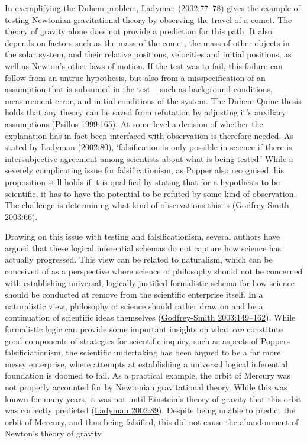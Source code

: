 \documentclass[
  a4paper,
  oneside]{uiophdthesis}
\begin{document}
In exemplifying the Duhem problem, Ladyman (\protect\hyperlink{ref-ladyman2002}{2002:77--78}) gives the example of testing Newtonian gravitational theory by observing the travel of a comet. The theory of gravity alone does not provide a prediction for this path. It also depends on factors such as the mass of the comet, the mass of other objects in the solar system, and their relative positions, velocities and initial positions, as well as Newton's other laws of motion. If the test was to fail, this failure can follow from an untrue hypothesis, but also from a misspecification of an assumption that is subsumed in the test -- such as background conditions, measurement error, and initial conditions of the system. The Duhem-Quine thesis holds that any theory can be saved from refutation by adjusting it's auxiliary assumptions (\protect\hyperlink{ref-psillos1999}{Psillos 1999:165}). At some level a decision of whether the explanation has in fact been interfaced with observation is therefore needed. As stated by Ladyman (\protect\hyperlink{ref-ladyman2002}{2002:80}), `falsification is only possible in science if there is intersubjective agreement among scientists about what is being tested.' While a severely complicating issue for falsificationism, as Popper also recognised, his proposition still holds if it is qualified by stating that for a hypothesis to be scientific, it has to have the potential to be refuted by some kind of observation. The challenge is determining what kind of observations this is (\protect\hyperlink{ref-godfrey-smith2003}{Godfrey-Smith 2003:66}).

Drawing on this issue with testing and falsificationism, several authors have argued that these logical inferential schemas do not capture how science has actually progressed. This view can be related to naturalism, which can be conceived of as a perspective where science of philosophy should not be concerned with establishing universal, logically justified formalistic schema for how science should be conducted at remove from the scientific enterprise itself. In a naturalistic view, philosophy of science should rather draw on and be a continuation of scientific ideas themselves (\protect\hyperlink{ref-godfrey-smith2003}{Godfrey-Smith 2003:149--162}). While formalistic logic can provide some important insights on what \emph{can} constitute good components of strategies for scientific inquiry, such as aspects of Poppers falsificiationism, the scientific undertaking has been argued to be a far more messy enterprise, where attempts at establishing a universal logical inferential foundation is doomed to fail. As a practical example, the orbit of Mercury was not properly accounted for by Newtonian gravitational theory. While this was known for many years, it was not until Einstein's theory of gravity that this orbit was correctly predicted (\protect\hyperlink{ref-ladyman2002}{Ladyman 2002:89}). Despite being unable to predict the orbit of Mercury, and thus being falsified, this did not cause the abandonment of Newton's theory of gravity.
\end{document}
